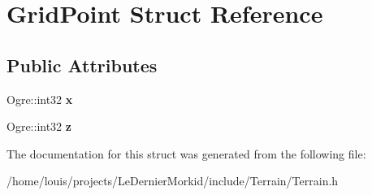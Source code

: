 \hypertarget{struct_grid_point}{}\section{Grid\+Point Struct Reference}
\label{struct_grid_point}
\subsection*{Public Attributes}
\begin{DoxyCompactItemize}
\item 
\mbox{\label{struct_grid_point_a6a2d6291fb359df17bdcce483c8283ee}} 
Ogre\+::int32 {\bfseries x}
\item 
\mbox{\label{struct_grid_point_a99f578ff1addf4e0ecd9c425f271a915}} 
Ogre\+::int32 {\bfseries z}
\end{DoxyCompactItemize}


The documentation for this struct was generated from the following file\+:\begin{DoxyCompactItemize}
\item 
/home/louis/projects/\+Le\+Dernier\+Morkid/include/\+Terrain/Terrain.\+h\end{DoxyCompactItemize}
